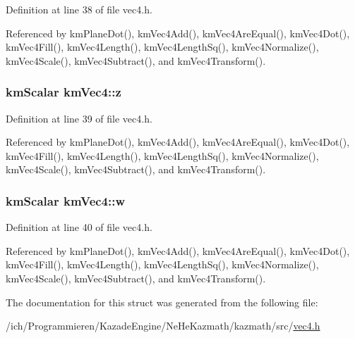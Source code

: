 Definition at line 38 of file vec4.h.

Referenced by kmPlaneDot(), kmVec4Add(), kmVec4AreEqual(), kmVec4Dot(), kmVec4Fill(), kmVec4Length(), kmVec4LengthSq(), kmVec4Normalize(), kmVec4Scale(), kmVec4Subtract(), and kmVec4Transform().\hypertarget{structkm_vec4_f4e022632723b68a304ac40d308cceab}{
\subsubsection[z]{\setlength{\rightskip}{0pt plus 5cm}kmScalar {\bf kmVec4::z}}}
\label{structkm_vec4_f4e022632723b68a304ac40d308cceab}




Definition at line 39 of file vec4.h.

Referenced by kmPlaneDot(), kmVec4Add(), kmVec4AreEqual(), kmVec4Dot(), kmVec4Fill(), kmVec4Length(), kmVec4LengthSq(), kmVec4Normalize(), kmVec4Scale(), kmVec4Subtract(), and kmVec4Transform().\hypertarget{structkm_vec4_b002db65c3793806ec266f2cc348879f}{
\subsubsection[w]{\setlength{\rightskip}{0pt plus 5cm}kmScalar {\bf kmVec4::w}}}
\label{structkm_vec4_b002db65c3793806ec266f2cc348879f}




Definition at line 40 of file vec4.h.

Referenced by kmPlaneDot(), kmVec4Add(), kmVec4AreEqual(), kmVec4Dot(), kmVec4Fill(), kmVec4Length(), kmVec4LengthSq(), kmVec4Normalize(), kmVec4Scale(), kmVec4Subtract(), and kmVec4Transform().

The documentation for this struct was generated from the following file:\begin{CompactItemize}
\item 
/ich/Programmieren/KazadeEngine/NeHeKazmath/kazmath/src/\hyperlink{vec4_8h}{vec4.h}\end{CompactItemize}
